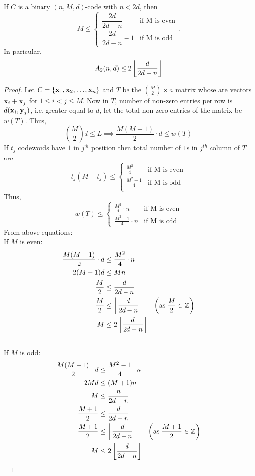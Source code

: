 \documentclass[../main.tex]{subfiles}
\begin{document}
\begin{lem}\label{plotkin_lemma0}
	If $C$ is a binary $(n,M,d)$-code with $n<2d$, then
	\[
		M\leq
		\begin{cases}
		\dfrac{2d}{2d-n} & \text{if M is even} \\
		\dfrac{2d}{2d-n} -1 & \text{if M is odd}
		\end{cases}.
	\]
	In paricular,
	\[
		A_2(n,d)\leq 2\left\lfloor \dfrac{d}{2d-n} \right\rfloor
	\]
\end{lem}

\begin{proof}
	Let $C=\{\textbf{x}_1,\textbf{x}_2,\ldots,\textbf{x}_n\}$ and $T$ be the $\binom{M}{2}\times n$ matrix whose are vectors $\textbf{x}_i + \textbf{x}_j$ for $1\leq i<j\leq M$. Now in $T$, number of non-zero entries per row is $d(\textbf{x}_i,\textbf{y}_j)$, i.e. greater equal to $d$, let the total non-zero entries of the matrix be $w(T)$. Thus,
	\[
		\binom{M}{2}d \leq L \implies \frac{M(M-1)}{2}\cdot d \leq w(T)
	\]
If $t_j$ codewords have $1$ in $j^{th}$ position then total number of $1$s in $j^{th}$ column of $T$ are
	\[
		t_j(M-t_j) \leq
		\begin{cases}
		\frac{M^2}{4} & \text{if M is even} \\
		\frac{M^2-1}{4} & \text{if M is odd} \\
		\end{cases}
	\]
Thus,
	\[
		w(T) \leq
		\begin{cases}
		\frac{M^2}{4}\cdot n & \text{if M is even} \\
		\frac{M^2-1}{4}\cdot n & \text{if M is odd}
		\end{cases}
	\]
From above equations:\\
\phantom{wfds} If $M$ is even:
	\begin{align*}
		\frac{M(M-1)}{2}\cdot d &\leq \frac{M^2}{4}\cdot n \\
		2(M-1)d &\leq Mn\\
		\dfrac{M}{2} &\leq \dfrac{d}{2d-n}\\
		\dfrac{M}{2} &\leq \left\lfloor \dfrac{d}{2d-n} \right\rfloor\hspace{5mm} \left(\text{as}\; \frac{M}{2}\in \mathbb{Z}\right)\\
		M &\leq 2\left\lfloor \dfrac{d}{2d-n} \right\rfloor
	\end{align*}
\\
\phantom{wfds} If $M$ is odd:
	\begin{align*}
		\frac{M(M-1)}{2}\cdot d &\leq \frac{M^2-1}{4}\cdot n \\
		2Md &\leq (M+1)n\\
		M &\leq \dfrac{n}{2d-n} \\
		\dfrac{M+1}{2} &\leq \dfrac{d}{2d-n} \\
		\dfrac{M+1}{2} &\leq \left\lfloor \dfrac{d}{2d-n} \right\rfloor\hspace{5mm} \left(\text{as}\; \frac{M+1}{2}\in \mathbb{Z}\right)\\
		M &\leq 2\left\lfloor \dfrac{d}{2d-n} \right\rfloor 
	\end{align*}  	 
\end{proof}
\end{document}

